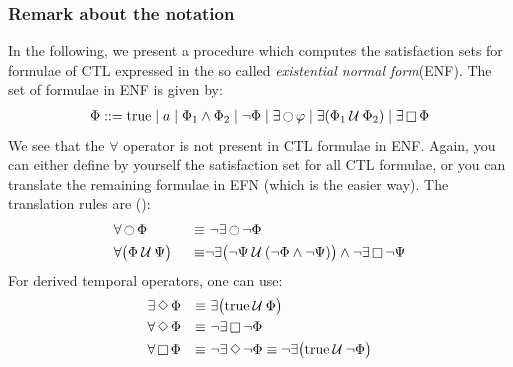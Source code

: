 \documentclass{article}
\begin{document}
\subsubsection{Remark about the notation}
In the following, we present a procedure which computes the satisfaction sets for formulae of 
CTL expressed in the so called \emph{existential normal form}(ENF). The set of formulae in ENF is given by: 
\begin{align*}
    & \Phi ::= \text{true} \mid a \mid \Phi_1 \land \Phi_2 \mid \neg \Phi \mid \exists \mathop{\ocircle}{\varphi} \mid \exists (\Phi_1 \mathbin{\mathcal{U}} \Phi_2) \mid \exists \mathop{\square} \Phi \\
\end{align*}
We see that the $\forall$ operator is not present in CTL formulae in ENF.
Again, you can either define by yourself the satisfaction set for all CTL formulae, 
or you can translate the remaining formulae in EFN (which is the easier way).
The translation rules are (\cite[Paragraph 6.2.4]{BaKa}):
\begin{align*}
    & \forall \mathop{\ocircle}{\Phi} & \equiv & \text{ } \neg \exists \mathop{\ocircle}{\neg \Phi} \\
    & \forall \big( \Phi \mathbin{\mathcal{U}} \Psi \big) & \text{ } \equiv & \neg \exists \big( \neg \Psi \mathbin{\mathcal{U}} (\neg \Phi \land \neg \Psi) \big) \land \neg \exists \mathop{\square} \neg \Psi \\
\end{align*}
For derived temporal operators, one can use:
\begin{align*}
    & \exists \mathop{\Diamond} \Phi & \equiv & \text{ } \exists \big(\text{true} \mathbin{\mathcal{U}} \Phi\big) \\
    & \forall \mathop{\Diamond} \Phi & \equiv  & \text{ }\neg \exists \mathop{\square} \neg \Phi \\ 
    & \forall \mathop{\square} \Phi & \equiv & \text{ } \neg \exists \mathop{\Diamond} \neg \Phi \equiv \neg \exists \big(\text{true} \mathbin{\mathcal{U}} \neg \Phi \big) \\
\end{align*}
\end{document}
